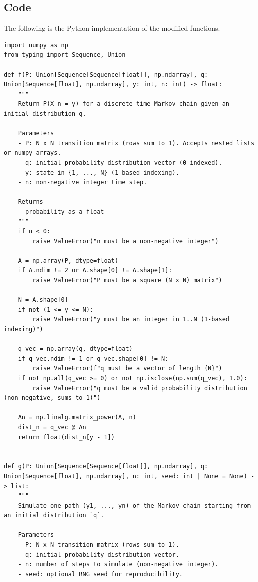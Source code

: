 \documentclass{article}
\begin{document}
\subsection*{Code}
The following is the Python implementation of the modified functions.

\begin{lstlisting}[style=py, caption={Updated \texttt{f} and \texttt{g} functions from \texttt{MATH541PS1/HW1/markov.py}}]
import numpy as np
from typing import Sequence, Union

def f(P: Union[Sequence[Sequence[float]], np.ndarray], q: Union[Sequence[float], np.ndarray], y: int, n: int) -> float:
    """
    Return P(X_n = y) for a discrete-time Markov chain given an initial distribution q.

    Parameters
    - P: N x N transition matrix (rows sum to 1). Accepts nested lists or numpy arrays.
    - q: initial probability distribution vector (0-indexed).
    - y: state in {1, ..., N} (1-based indexing).
    - n: non-negative integer time step.

    Returns
    - probability as a float
    """
    if n < 0:
        raise ValueError("n must be a non-negative integer")

    A = np.array(P, dtype=float)
    if A.ndim != 2 or A.shape[0] != A.shape[1]:
        raise ValueError("P must be a square (N x N) matrix")

    N = A.shape[0]
    if not (1 <= y <= N):
        raise ValueError("y must be an integer in 1..N (1-based indexing)")

    q_vec = np.array(q, dtype=float)
    if q_vec.ndim != 1 or q_vec.shape[0] != N:
        raise ValueError(f"q must be a vector of length {N}")
    if not np.all(q_vec >= 0) or not np.isclose(np.sum(q_vec), 1.0):
        raise ValueError("q must be a valid probability distribution (non-negative, sums to 1)")

    An = np.linalg.matrix_power(A, n)
    dist_n = q_vec @ An
    return float(dist_n[y - 1])


def g(P: Union[Sequence[Sequence[float]], np.ndarray], q: Union[Sequence[float], np.ndarray], n: int, seed: int | None = None) -> list:
    """
    Simulate one path (y1, ..., yn) of the Markov chain starting from an initial distribution `q`.

    Parameters
    - P: N x N transition matrix (rows sum to 1).
    - q: initial probability distribution vector.
    - n: number of steps to simulate (non-negative integer).
    - seed: optional RNG seed for reproducibility.


\end{lstlisting}
\end{document}
